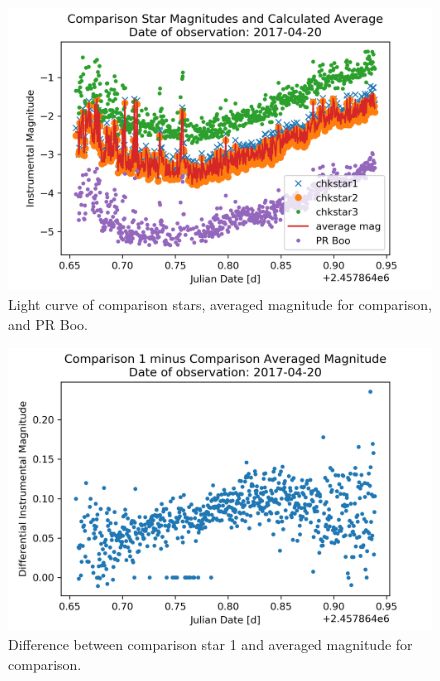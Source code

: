 \begin{figure}[h]
    \centering
    \includegraphics{figures/prboo170420COM.png}
    \caption{Light curve of comparison stars, averaged magnitude for comparison, and PR Boo.}
\label{fig:prCOM2}
\end{figure}

\begin{figure}[h]
    \centering
    \includegraphics{figures/prboo170420CHK.png}
    \caption{Difference between comparison star 1 and averaged magnitude for comparison.}
\label{fig:prCHK2}
\end{figure}

